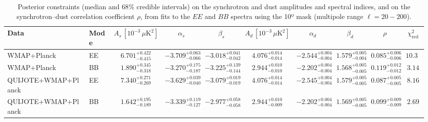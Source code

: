 \begin{table}[h]
\centering
\scriptsize
\setlength{\tabcolsep}{4pt}
\caption{Posterior constraints (median and $68\%$ credible intervals) on the synchrotron and dust amplitudes and spectral indices, and on the synchrotron--dust correlation coefficient $\rho$, from fits to the $EE$ and $BB$ spectra using the 10º mask (multipole range $\ell=20-200$).}
\label{tab:fit_no_QQ_autos_ell20-200}
\begin{tabular}{llcccccccc}
\toprule
Data & Mode & $A_s\,[10^{-3}\,\mu\mathrm{K}^2]$ & $\alpha_s$ & $\beta_s$ & $A_d\,[10^{-3}\,\mu\mathrm{K}^2]$ & $\alpha_d$ & $\beta_d$ & $\rho$ & $\chi^2_\mathrm{red}$ \\
\midrule
WMAP+Planck & EE & $6.701^{+0.422}_{-0.415}$ & $-3.709^{+0.063}_{-0.066}$ & $-3.018^{+0.041}_{-0.042}$ & $4.076^{+0.014}_{-0.014}$ & $-2.544^{+0.004}_{-0.004}$ & $1.579^{+0.005}_{-0.004}$ & $0.085^{+0.006}_{-0.006}$ & $10.32$ \\
WMAP+Planck & BB & $1.890^{+0.345}_{-0.318}$ & $-3.270^{+0.175}_{-0.187}$ & $-3.225^{+0.139}_{-0.144}$ & $2.944^{+0.010}_{-0.010}$ & $-2.202^{+0.004}_{-0.004}$ & $1.568^{+0.005}_{-0.005}$ & $0.119^{+0.012}_{-0.012}$ & $3.14$ \\
QUIJOTE+WMAP+Planck & EE & $7.340^{+0.271}_{-0.269}$ & $-3.629^{+0.039}_{-0.040}$ & $-3.079^{+0.019}_{-0.019}$ & $4.076^{+0.014}_{-0.014}$ & $-2.545^{+0.004}_{-0.004}$ & $1.579^{+0.005}_{-0.005}$ & $0.087^{+0.005}_{-0.005}$ & $8.16$ \\
QUIJOTE+WMAP+Planck & BB & $1.642^{+0.195}_{-0.189}$ & $-3.339^{+0.119}_{-0.127}$ & $-2.977^{+0.058}_{-0.058}$ & $2.944^{+0.010}_{-0.009}$ & $-2.202^{+0.004}_{-0.004}$ & $1.569^{+0.005}_{-0.005}$ & $0.099^{+0.009}_{-0.009}$ & $2.69$ \\
\bottomrule
\end{tabular}
\end{table}